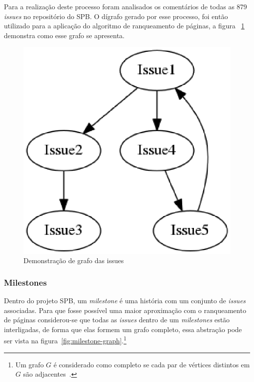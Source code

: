 Para a realização deste processo foram analisados os comentários de todas as 879 \textit{issues} no repositório do SPB. O dígrafo gerado por esse processo, foi então utilizado para a aplicação do algoritmo de ranqueamento de páginas, a figura ~\ref{fig:issue-graph} demonstra como esse grafo se apresenta.

\begin{figure}[h]
    \centering
        \includegraphics[keepaspectratio=true,scale=0.5]{figuras/issue-graph.eps}
    \caption{Demonstração de grafo das issues}
    \label{fig:issue-graph}
\end{figure}


\subsubsection{Milestones}
\label{est:ran:mil}

Dentro do projeto SPB, um \textit{milestone} é uma história com um conjunto de \textit{issues} associadas. Para que fosse possível uma maior aproximação com o ranqueamento de páginas considerou-se que todas as \textit{issues} dentro de um \textit{milestones} estão interligadas, de forma que elas formem um grafo completo, essa abstração pode ser vista na figura~\ref{fig:milestone-graph}.\footnote{Um grafo $G$ é considerado como completo se cada par de vértices distintos em $G$ são adjacentes~\cite{bang}.}

